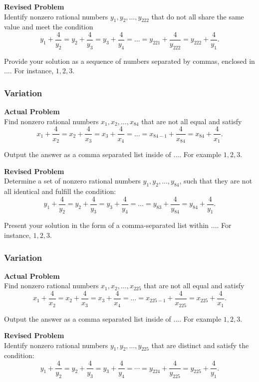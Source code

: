 \textbf{Revised Problem}\\
Identify nonzero rational numbers $y_1, y_2, \ldots, y_{222}$ that do not all share the same value and meet the condition 
$$y_1+\frac{4}{y_2}=y_2+\frac{4}{y_3}=y_3+\frac{4}{y_4}=\ldots=y_{221}+\frac{4}{y_{222}}=y_{222}+\frac{4}{y_1}.$$

Provide your solution as a sequence of numbers separated by commas, enclosed in $\boxed{...}$. For instance, $\boxed{1, 2, 3}$.

\subsubsection{Variation}
\textbf{Actual Problem}\\
Find nonzero rational numbers $x_1,x_2,\ldots,x_{84}$ that are not all equal and satisfy 
$$x_1+\frac{4}{x_2}=x_2+\frac{4}{x_3}=x_3+\frac{4}{x_4}=\ldots=x_{84-1}+\frac{4}{x_{84}}=x_{84}+\frac{4}{x_1}.$$

Output the answer as a comma separated list inside of $\boxed{...}$. For example $\boxed{1, 2, 3}$.

\textbf{Revised Problem}\\
Determine a set of nonzero rational numbers \( y_1, y_2, \ldots, y_{84} \), such that they are not all identical and fulfill the condition:
$$ y_1 + \frac{4}{y_2} = y_2 + \frac{4}{y_3} = y_3 + \frac{4}{y_4} = \ldots = y_{83} + \frac{4}{y_{84}} = y_{84} + \frac{4}{y_1}. $$

Present your solution in the form of a comma-separated list within $\boxed{...}$. For instance, $\boxed{1, 2, 3}$.

\subsubsection{Variation}
\textbf{Actual Problem}\\
Find nonzero rational numbers $x_1,x_2,\ldots,x_{225}$ that are not all equal and satisfy 
$$x_1+\frac{4}{x_2}=x_2+\frac{4}{x_3}=x_3+\frac{4}{x_4}=\ldots=x_{225-1}+\frac{4}{x_{225}}=x_{225}+\frac{4}{x_1}.$$

Output the answer as a comma separated list inside of $\boxed{...}$. For example $\boxed{1, 2, 3}$.

\textbf{Revised Problem}\\
Identify nonzero rational numbers \(y_1, y_2, \ldots, y_{225}\) that are distinct and satisfy the condition:
\[ y_1 + \frac{4}{y_2} = y_2 + \frac{4}{y_3} = y_3 + \frac{4}{y_4} = \cdots = y_{224} + \frac{4}{y_{225}} = y_{225} + \frac{4}{y_1}. \]

